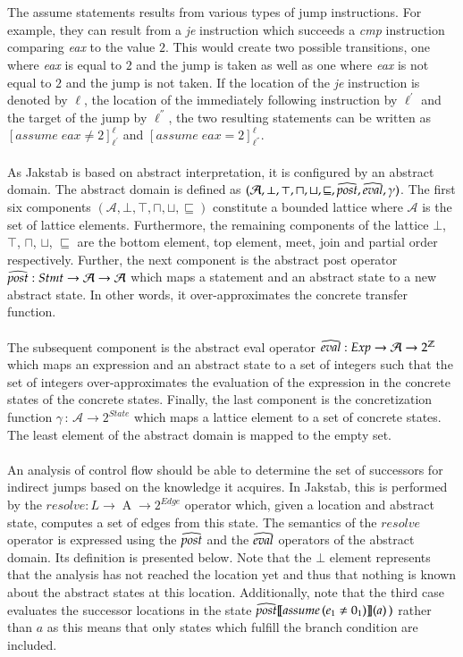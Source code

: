 \documentclass{kththesis}
\renewcommand{\it}[1]{\textit{#1}}
\newcommand{\bighat}[1]{\widehat{\textrm{\emph{\rule{0ex}{1.2ex}\smash{#1}}}}}
\begin{document}
\\ \\
The assume statements results from various types of jump instructions. For example, they can result from a \it{je} instruction which succeeds a \it{cmp} instruction comparing \it{eax} to the value $2$. This would create two possible transitions, one where \it{eax} is equal to $2$ and the jump is taken as well as one where \it{eax} is not equal to $2$ and the jump is not taken. If the location of the \it{je} instruction is denoted by $\ell$, the location of the immediately following instruction by $\ell^{'}$ and the target of the jump by $\ell^{''}$, the two resulting statements can be written as $[assume\;eax \neq 2]^{\ell}_{\ell^{'}}$ and $[assume\;eax = 2]^{\ell}_{\ell^{''}}$.
\\ \\
As Jakstab is based on abstract interpretation, it is configured by an abstract domain. The abstract domain is defined as $(\mathcal{A}, \bot, \top, \sqcap, \sqcup, \sqsubseteq, \bighat{post}, \bighat{eval}, \gamma)$. The first six components $(\mathcal{A}, \bot, \top, \sqcap, \sqcup, \sqsubseteq)$ constitute a  bounded lattice where $\mathcal{A}$ is the set of lattice elements. Furthermore, the remaining components of the lattice $\bot$, $\top$, $\sqcap$, $\sqcup$, $\sqsubseteq$ are the bottom element, top element, meet, join and partial order respectively. Further, the next component is the abstract post operator $\bighat{post} : Stmt \rightarrow \mathcal{A} \rightarrow \mathcal{A}$ which maps a statement and an abstract state to a new abstract state. In other words, it over-approximates the concrete transfer function. \\ \\
The subsequent component is the abstract eval operator $\bighat{eval}: Exp \rightarrow \mathcal{A} \rightarrow 2^\mathbb{Z}$ which maps an expression and an abstract state to a set of integers such that the set of integers over-approximates the evaluation of the expression in the concrete states of the concrete states. Finally, the last component is the concretization function $\gamma\,:\,\mathcal{A} \rightarrow 2^{State}$ which maps a lattice element to a set of concrete states. The least element of the abstract domain is mapped to the empty set.
\\ \\
An analysis of control flow should be able to determine the set of successors for indirect jumps based on the knowledge it acquires. In Jakstab, this is performed by the $resolve : L \rightarrow \mathrel{A} \rightarrow 2^{Edge}$ operator which, given a location and abstract state, computes a set of edges from this state. The semantics of the $resolve$ operator is expressed using the $\bighat{post}$ and the $\bighat{eval}$ operators of the abstract domain. Its definition is presented below. Note that the $\bot$ element represents that the analysis has not reached the location yet and thus that nothing is known about the abstract states at this location. Additionally, note that the third case evaluates the successor locations in the state $\bighat{post}\text{\textlbrackdbl} assume\,(e_1 \neq 0_1 ) \text{\textrbrackdbl}(a)\,)$ rather than $a$ as this means that only states which fulfill the branch condition are included. 
\end{document}

